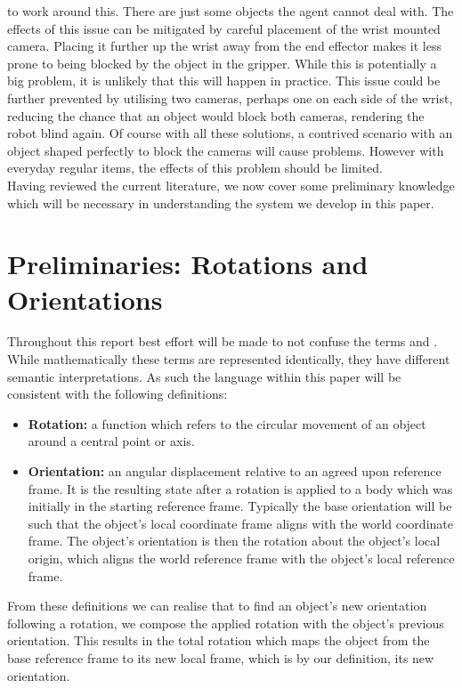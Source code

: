 to work around this. There are just some objects the agent cannot deal with. The effects of this issue can be mitigated by careful placement of the wrist mounted camera. Placing it further up the wrist away from the end effector makes it less prone to being blocked by the object in the gripper. While this is potentially a big problem, it is unlikely that this will happen in practice. This issue could be further prevented by utilising two cameras, perhaps one on each side of the wrist, reducing the chance that an object would block both cameras, rendering the robot blind again. Of course with all these solutions, a contrived scenario with an object shaped perfectly to block the cameras will cause problems. However with everyday regular items, the effects of this problem should be limited.\\

Having reviewed the current literature, we now cover some preliminary knowledge which will be necessary in understanding the system we develop in this paper.

\section{Preliminaries: Rotations and Orientations}
\label{sec:rotations}
Throughout this report best effort will be made to not confuse the terms  and . While mathematically these terms are represented identically, they have different semantic interpretations. As such the language within this paper will be consistent with the following definitions:
\begin{itemize}
    \item \textbf{Rotation:} a function which refers to the circular movement of an object around a central point or axis.
    \item \textbf{Orientation:} an angular displacement relative to an agreed upon reference frame. It is the resulting state after a rotation is applied to a body which was initially in the starting reference frame. Typically the base orientation will be such that the object's local coordinate frame aligns with the world coordinate frame. The object's orientation is then the rotation about the object's local origin, which aligns the world reference frame with the object's local reference frame.
\end{itemize}

From these definitions we can realise that to find an object's new orientation following a rotation, we compose the applied rotation with the object's previous orientation. This results in the total rotation which maps the object from the base reference frame to its new local frame, which is by our definition, its new orientation.\\

